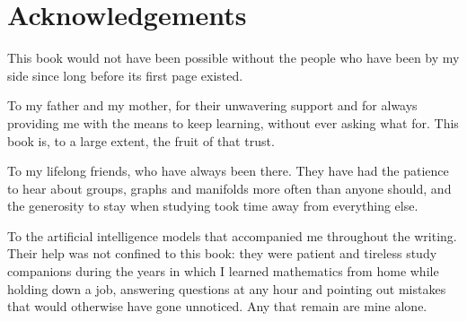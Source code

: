 \section*{Acknowledgements}

This book would not have been possible without the people who have been
by my side since long before its first page existed.

To my father and my mother, for their unwavering support and for always
providing me with the means to keep learning, without ever asking what
for. This book is, to a large extent, the fruit of that trust.

To my lifelong friends, who have always been there. They have had the
patience to hear about groups, graphs and manifolds more often than
anyone should, and the generosity to stay when studying took time away
from everything else.

To the artificial intelligence models that accompanied me throughout the
writing. Their help was not confined to this book: they were patient and
tireless study companions during the years in which I learned
mathematics from home while holding down a job, answering questions at
any hour and pointing out mistakes that would otherwise have gone
unnoticed. Any that remain are mine alone.
